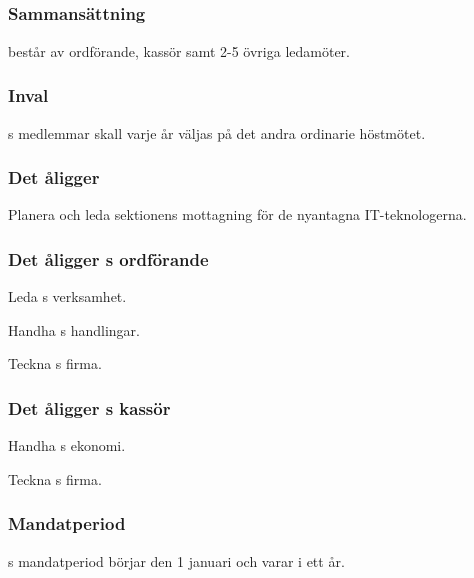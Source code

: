 \subsection{\NOLLKITFULL}
\subsubsection{Sammansättning}
\NOLLKIT{} består av ordförande, kassör samt 2-5 övriga ledamöter.

\subsubsection{Inval}
\NOLLKIT{}s medlemmar skall varje år väljas på det andra ordinarie höstmötet.

\subsubsection{Det åligger \NOLLKIT}
\begin{att}
	\item Planera och leda sektionens mottagning för de nyantagna IT-teknologerna.
\end{att}

\subsubsection{Det åligger \NOLLKIT{}s ordförande}
\begin{att}
	\item Leda \NOLLKIT{}s verksamhet.
	\item Handha \NOLLKIT{}s handlingar.
	\item Teckna \NOLLKIT{}s firma.
\end{att}

\subsubsection{Det åligger \NOLLKIT{}s kassör}
\begin{att}
	\item Handha \NOLLKIT{}s ekonomi.
	\item Teckna \NOLLKIT{}s firma.
\end{att}

\subsubsection{Mandatperiod}
\NOLLKIT{}s mandatperiod börjar den 1 januari och varar i ett år.